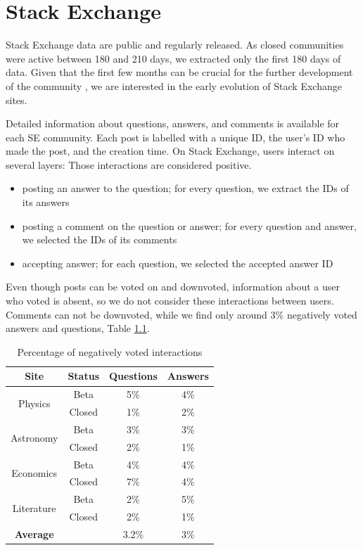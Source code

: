 \chapter{Stack Exchange}
\label{App:SE}
Stack Exchange data are public and regularly released. As closed communities were active between 180 and 210 days, we extracted only the first 180 days of data. Given that the first few months can be crucial for the further development of the community \cite{dover2020sustainable}, we are interested in the early evolution of Stack Exchange sites. 

Detailed information about questions, answers, and comments is available for each SE community. Each post is labelled with a unique ID, the user's ID who made the post, and the creation time. On Stack Exchange, users interact on several layers: Those interactions are considered positive.
\begin{itemize}
	\item posting an answer to the question; for every question, we extract the IDs of its answers
	\item posting a comment on the question or answer; for every question and answer, we selected the IDs of its comments
	\item accepting answer; for each question, we selected the accepted answer ID
\end{itemize}

Even though posts can be voted on and downvoted, information about a user who voted is absent, so we do not consider these interactions between users. Comments can not be downvoted, while we find only around 3\% negatively voted answers and questions, Table \ref{tab:negint}.

\begin{table}[hbt!]
	\centering
	\caption{Percentage of negatively voted interactions}
	\label{tab:negint}
	\begin{tabular}{cc|cc}
		
		\hline
		Site                        & Status & Questions & Answers \\ \hline
		\multirow{2}{*}{Physics}    & Beta   & 5\%       & 4\%     \\
		& Closed & 1\%       & 2\%     \\ \hline
		\multirow{2}{*}{Astronomy}  & Beta   & 3\%       & 3\%     \\
		& Closed & 2\%       & 1\%     \\ \hline
		\multirow{2}{*}{Economics}  & Beta   & 4\%       & 4\%     \\
		& Closed & 7\%       & 4\%     \\ \hline
		\multirow{2}{*}{Literature} & Beta   & 2\%       & 5\%     \\ 
		& Closed & 2\%       & 1\%     \\ \hline \hline
		\textbf{Average}            &        & 3.2\%     & 3\%     \\ \hline 
	\end{tabular}
\end{table}



